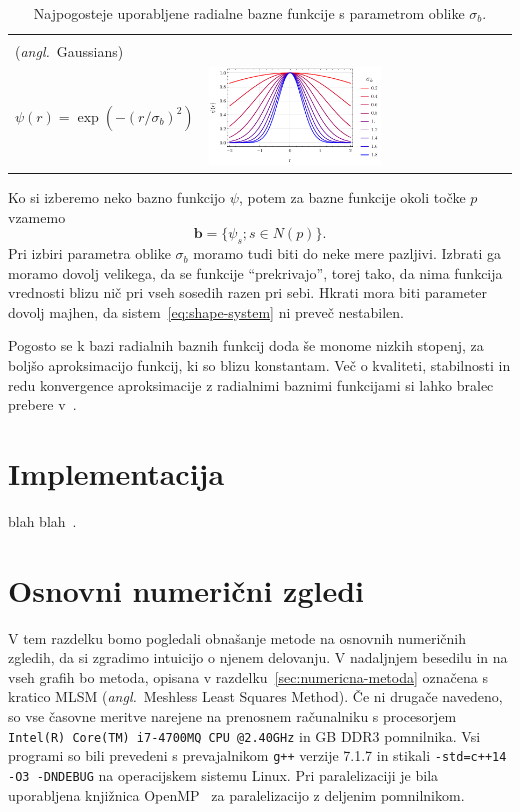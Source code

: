 \documentclass[12pt,a4paper]{article}
\theoremstyle{definition} %
\theoremstyle{plain} %
\numberwithin{equation}{section}
\renewcommand{\b}{\boldsymbol}
\newcommand{\ang}[1]{(\textit{angl.}\ #1)}
\begin{document}
\begin{table}[!h]
\begin{tabular}{|m{5.2cm}|l|}
    \tc{Gaussove funkcije (G) \\ \ang{Gaussians} \\[3ex] $\psi(r) =
    \exp(-(r/\sigma_b)^2)$} & \includegraphics[width=0.58\textwidth]{images/rbf_gau.pdf} \\ \hline
  \end{tabular}
  \caption{Najpogosteje uporabljene radialne bazne funkcije s parametrom oblike
  $\sigma_b$.}
  \label{tab:rbf}
\end{table}

Ko si izberemo neko bazno funkcijo $\psi$, potem za bazne funkcije okoli točke
$p$ vzamemo
\[
  \b b = \{\psi_s; s \in N(p) \}.
\]
Pri izbiri parametra oblike $\sigma_b$ moramo tudi biti do neke mere pazljivi. Izbrati
ga moramo dovolj velikega, da se funkcije ``prekrivajo'', torej tako, da nima
funkcija vrednosti blizu nič pri vseh sosedih razen pri sebi. Hkrati mora biti
parameter dovolj majhen, da sistem~\eqref{eq:shape-system} ni preveč nestabilen.

Pogosto se k bazi radialnih baznih funkcij doda še monome nizkih stopenj, za
boljšo aproksimacijo funkcij, ki so blizu konstantam. Več o kvaliteti,
stabilnosti in redu konvergence aproksimacije z radialnimi baznimi funkcijami
si lahko bralec prebere v~\cite{buhmann2000radial}.

\section{Implementacija}
\label{sec:implementacija}
blah blah~\cite{stroustrup1995c++}.

\section{Osnovni numerični zgledi}
\label{sec:osnovni-zgledi}
V tem razdelku bomo pogledali obnašanje metode na osnovnih numeričnih zgledih,
da si zgradimo intuicijo o njenem delovanju. V nadaljnjem besedilu in na vseh grafih bo
metoda, opisana v razdelku~\ref{sec:numericna-metoda} označena s kratico MLSM
\ang{Meshless Least Squares Method}.
Če ni drugače navedeno, so vse časovne meritve narejene na
prenosnem računalniku s procesorjem
\verb|Intel(R) Core(TM) i7-4700MQ CPU @2.40GHz|
in \unit[16]{GB} DDR3 pomnilnika. Vsi programi so bili prevedeni s
prevajalnikom \verb|g++| verzije 7.1.7 in stikali
\verb|-std=c++14 -O3 -DNDEBUG| na operacijskem sistemu Linux.
Pri paralelizaciji je bila uporabljena knjižnica OpenMP~\cite{dagum1998openmp}
za paralelizacijo z deljenim pomnilnikom.
\end{document}
